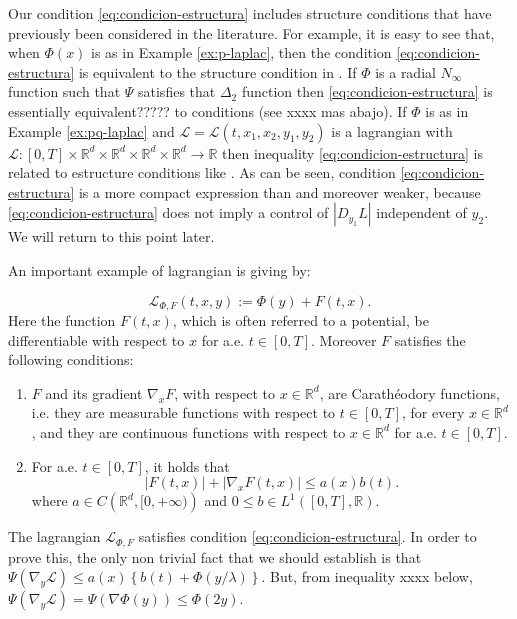 \documentclass[twoside]{article}
\makeatletter
\theoremstyle{remark}
\newcommand{\labitem}[2]{%
\def\@itemlabel{\textbf{#1}}
\item
\def\@currentlabel{#1}\label{#2}}
\newcommand{\rr}{\mathbb{R}}
\renewcommand{\leq}{\leqslant}
\newcounter{example}[section]
\makeatother
\begin{document}
Our condition \eqref{eq:condicion-estructura} includes structure conditions that have previously been considered in the literature. For example, it is easy to see that, when $\Phi(x)$ is as in Example \ref{ex:p-laplac}, then  the condition \eqref{eq:condicion-estructura}  is equivalent to the structure condition in  \cite[Th. 1.4]{mawhin2010critical}.  If $\Phi$ is a radial $N_{\infty}$ function such that $\Psi$ satisfies that $\Delta_2$ function  then \eqref{eq:condicion-estructura} is essentially equivalent????? to conditions  \cite[Eq. (2)-(4)]{ABGMS2015} (see xxxx mas abajo).   If $\Phi$ is as in Example \ref{ex:pq-laplac} and $\mathcal{L}=\mathcal{L}(t,x_1,x_2,y_1,y_2)$ is a lagrangian with $\mathcal{L}:[0,T]\times\rr^d\times\rr^d\times\rr^d\times\rr^d\to\rr$ then inequality \eqref{eq:condicion-estructura} is related to estructure conditions like
\cite[Lemma 3.1, Eq. (3.1)]{Tian2007192}. As can be seen, condition \eqref{eq:condicion-estructura} is a more compact expression than \cite[Lemma 3.1, Eq. (3.1)]{Tian2007192} and moreover   weaker, because  \eqref{eq:condicion-estructura} does not imply a control of
$|D_{y_1}L|$ independent of $y_2$.  We will return to this point later.


An important example of lagrangian  is giving by:

\begin{equation}\label{eq:lagrange_phi}
\mathcal{L}_{\Phi,F}(t,x,y):=\Phi(y)+F(t,x).
\end{equation}
Here the function $F(t,x)$, which is often referred to a potential,  be differentiable with respect to $x$ for a.e. $t\in [0,T]$. Moreover $F$ satisfies the following conditions:
\begin{enumerate}
\labitem{(C)}{item:condicion_c} $F$ and its gradient $\nabla_x F$, with respect to $x\in\rr^d$,  are  Carath\'eodory functions, i.e. they are measurable functions with respect to $t\in [0,T]$, for every  $x\in\rr^d$, and they are continuous functions with  respect to  $x\in\rr^d$ for a.e. $t \in [0,T]$.
 \labitem{(A)}{item:condicion_a}  For   a.e. $t\in [0,T]$, it holds that
\begin{equation}
|F(t,x)| + |\nabla_x F(t,x)|  \leq a(x)b(t).
\end{equation}
where  $a\in C\left(\rr^d,[0,+\infty)\right)$ and $0\leq b\in L^1([0,T],\rr)$.
\end{enumerate}

The lagrangian $\mathcal{L}_{\Phi,F}$ satisfies condition  \eqref{eq:condicion-estructura}. In order to prove this, 
the only non trivial fact that we should establish is that $ \Psi(\nabla_{y}\mathcal{L})
\leq
a(x)\left\{b(t)+ \Phi\left({y}/{\lambda}\right)\right\}$. But, from inequality xxxx below, 
$\Psi(\nabla_{y}\mathcal{L})=\Psi\left(\nabla\Phi(y)\right)\leq \Phi(2y)$.
\end{document}
